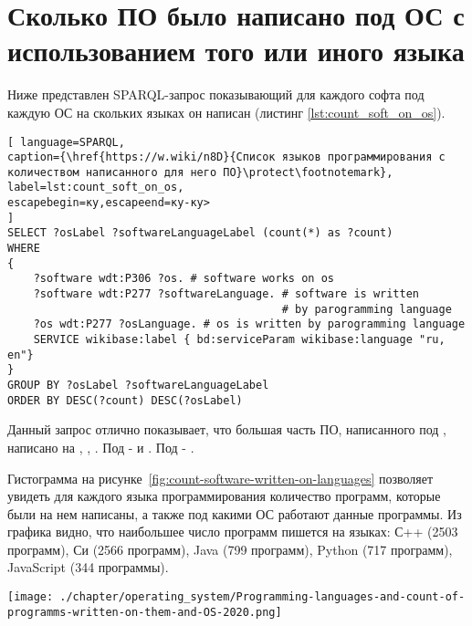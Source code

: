 \section{Сколько ПО было написано под ОС с использованием того или иного языка}
Ниже представлен SPARQL-запрос показывающий для каждого софта под каждую ОС на скольких языках он написан (листинг \ref{lst:count_soft_on_os}).

\begin{lstlisting}[ language=SPARQL, 
caption={\href{https://w.wiki/n8D}{Список языков программирования с количеством написанного для него ПО}\protect\footnotemark},
label=lst:count_soft_on_os, 
escapebegin=ку,escapeend=ку-ку>
]
SELECT ?osLabel ?softwareLanguageLabel (count(*) as ?count)
WHERE
{
	?software wdt:P306 ?os. # software works on os
	?software wdt:P277 ?softwareLanguage. # software is written 
                                          # by parogramming language
	?os wdt:P277 ?osLanguage. # os is written by parogramming language
	SERVICE wikibase:label { bd:serviceParam wikibase:language "ru, en"}
}
GROUP BY ?osLabel ?softwareLanguageLabel
ORDER BY DESC(?count) DESC(?osLabel)
\end{lstlisting}

 Данный запрос отлично показывает, что большая часть ПО, написанного под , написано на , , . Под  -  и . Под  - .


Гистограмма на рисунке~\ref{fig:count-software-written-on-languages} позволяет увидеть для каждого языка программирования количество программ, которые были на нем написаны, а также под какими ОС работают данные программы. Из графика видно, что наибольшее число программ пишется на языках: С++ (2503 программ), Си (2566 программ), Java (799 программ), Python (717 программ),  JavaScript (344 программы).


\begin{figure*}[h!]
	\texttt{[image: ./chapter/operating\_system/Programming-languages-and-count-of-programms-written-on-them-and-OS-2020.png]}
	\caption{Языки программирования и количества ОС, под которыми работают программы, написанные на них 2020 год.}
	\label{fig:count-software-written-on-languages}
\end{figure*}

